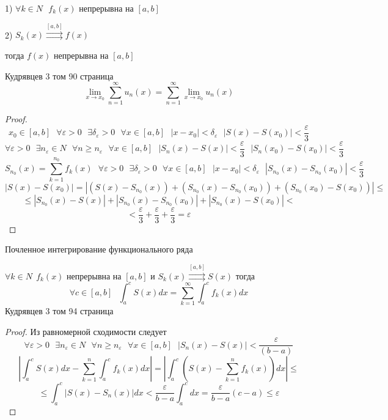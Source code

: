 \begin{theorem}
  1) $\forall k \in N ~~~ f_k(x)$ непрерывна на $[a,b]$

  2) $S_k (x) \stackrel{[a,b]}{\rightrightarrows} f(x)$

  тогда $f(x)$ непрерывна на $[a,b]$

  Кудрявцев 3 том 90 страница
  $$
  \lim_{x \to x_0} \sum_{n=1}^{\infty} u_n (x) = \sum_{n=1}^{\infty}
  \lim_{x \to x_0} u_n(x)
  $$
\end{theorem}

\begin{proof}
  $$
  x_0 \in [a,b] ~~~ \forall \varepsilon > 0 ~~~ \exists \delta_{\varepsilon} > 0
   ~~~ \forall x \in [a,b] ~~~ |x - x_0| < \delta_{\varepsilon} ~~~
  |S(x) - S(x_0)| < \frac{\varepsilon}{3}
  $$
  $$
  \forall \varepsilon > 0 ~~~ \exists n_{\varepsilon} \in N ~~~ \forall n \ge
  n_{\varepsilon} ~~~ \forall x \in [a,b] ~~~ |S_n(x) - S(x)| <
  \frac{\varepsilon}{3} ~~~ |S_n(x_0) - S(x_0)| < \frac{\varepsilon}{3}
  $$
  $$
  S_{n_0}(x) = \sum_{k=1}^{n_0} f_k(x) ~~~ \forall \varepsilon > 0 ~~~
  \exists \delta_{\varepsilon} > 0 ~~~ \forall x \in [a,b] ~~~ |x - x_0| <
  \delta_{\varepsilon} ~~~ |S_{n_0}(x) - S_{n_0}(x_0)| < \frac{\varepsilon}{3}
  $$
  $$
  |S(x) - S(x_0)| =  |(S(x) - S_{n_0}(x)) + (S_{n_0}(x) - S_{n_0}(x_0))
  + (S_{n_0}(x_0) - S(x_0))| \le
  $$
  $$
   \le |S_{n_0}(x) - S(x)| +
  |S_{n_0}(x) - S_{n_0}(x_0)| + |S_{n_0}(x) - S(x_0)| <
  $$
  $$
  < \frac{\varepsilon}{3} +
  \frac{\varepsilon}{3} + \frac{\varepsilon}{3} = \varepsilon
  $$
\end{proof}

\begin{title}[\Large]
  Почленное интегрирование функционального ряда
\end{title}

\begin{theorem}
  $\forall k \in N ~~ f_k(x)$ непрерывна на $[a,b]$ и
  $S_k(x) \stackrel{[a,b]}{\rightrightarrows} S(x)$ тогда
  $$
  \forall c \in [a,b] ~~~ \int_a^c S(x)dx =
  \sum_{k=1}^{\infty} \int_a^c f_k(x)dx
  $$
  Кудрявцев 3 том 94 страница
\end{theorem}

\begin{proof}
  Из равномерной сходимости следует
  $$
  \forall \varepsilon  > 0 ~~~ \exists n_{\varepsilon} \in N ~~~
  \forall n \ge n_{\varepsilon} ~~~ \forall x \in[a,b] ~~~
  |S_n(x) - S(x)| < \frac{\varepsilon}{(b-a)}
  $$
  $$
  \left| \int_a^c S(x)dx - \sum_{k=1}^n \int_a^c f_k(x)dx \right| =
  \left| \int_a^c \left( S(x) - \sum_{k=1}^n f_k(x) \right)dx \right| \le
  $$
  $$
  \le \int_a^c |S(x) - S_n(x)|dx < \frac{\varepsilon}{b-a} \int_a^c dx =
  \frac{\varepsilon}{b-a}(c-a) \le \varepsilon
  $$
\end{proof}

